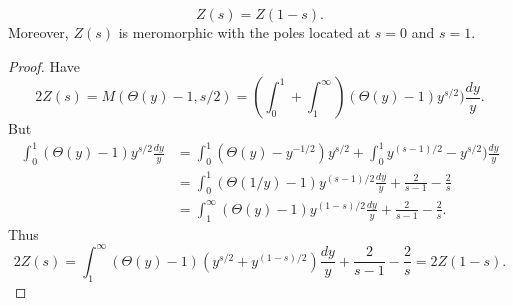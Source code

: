 \documentclass{memoir}
\begin{document}
\begin{thm}
    \begin{equation}
        Z(s) = Z(1-s).
    \end{equation}
    Moreover, $Z(s)$ is meromorphic with the poles located at $s=0$ and $s=1$.
\end{thm}
\begin{proof}
    Have
    \begin{equation}
        2Z(s) = M(\Theta(y)-1,s/2) = \left(\int_0^1+\int_1^\infty\right)(\Theta(y)-1)y^{s/2})\frac{dy}y.
    \end{equation}
    But
    \begin{align}
        \int_0^1(\Theta(y)-1)y^{s/2}\frac{dy}y &= \int_0^1(\Theta(y)-y^{-1/2})y^{s/2}+\int_0^1y^{(s-1)/2}-y^{s/2})\frac{dy}y \nonumber \\
                                               &= \int_0^1(\Theta(1/y)-1)y^{(s-1)/2}\frac{dy}y + \frac2{s-1} -\frac2s \nonumber \\
                                               &= \int_1^\infty(\Theta(y)-1)y^{(1-s)/2}\frac{dy}y + \frac2{s-1} -\frac2s.
    \end{align}
    Thus
    \begin{equation}
        2Z(s) = \int_1^\infty(\Theta(y)-1)(y^{s/2}+y^{(1-s)/2})\frac{dy}y + \frac2{s-1}-\frac2s = 2Z(1-s).
    \end{equation}
\end{proof}
\end{document}
